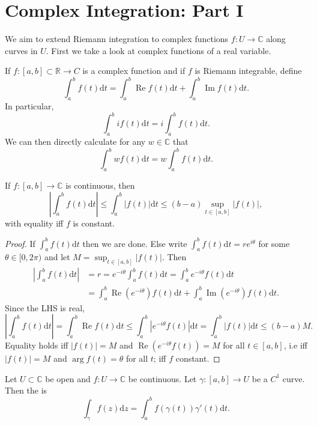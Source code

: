 \documentclass[a4paper]{scrartcl}
\begin{document}
\section{Complex Integration: Part I}
We aim to extend Riemann integration to complex functions $f: U \rightarrow \mathbb{C}$ along curves in $U$. First we take a look at complex functions of a real variable. 
\begin{definition*}
      If $f: [a,b] \subset \mathbb{R} \rightarrow C$ is a complex function and if $f$ is Riemann integrable, define \[
      \int_{a}^{b}f (t) \mathrm{d}t= \int_{a}^{b}\operatorname{Re} f (t) \mathrm{d}t+ \int_{a}^{b}\operatorname{Im}f (t) \mathrm{d}t   
      .\] In particular, \[
      \int_{a}^{b}i f (t) \mathrm{d}t =i \int_{a}^{b}f (t) \mathrm{d}t  
      .\] We can then directly calculate for any $w \in \mathbb{C}$ that \[
          \int_{a}^{b}w f (t) \mathrm{d}t =w\int_{a}^{b}f (t) \mathrm{d}t 
      .\] 
\end{definition*}
\begin{proposition}
      If $f: [a,b] \rightarrow \mathbb{C}$ is continuous, then \[
      |\int_{a}^{b} f (t) \mathrm{d}t | \leq \int_{a}^{b} |f (t)| \mathrm{d}t \leq (b-a) \sup_{t \in [a,b]} |f (t)|
      ,\] with equality iff $f$ is constant. 
\end{proposition}
\begin{proof}
      If $\int_{a}^{b}f (t) \mathrm{d}t $ then we are done. Else write $\int_{a}^{b}f (t) \mathrm{d}t= re^{i \theta} $ for some $\theta \in [0,2\pi)$ and let $M=\sup_{t \in [a,b]} |f (t)|$. Then 
      \begin{align*}
           |\int_{a}^{b}f (t) \mathrm{d}t| &=r= e^{-i \theta}\int_{a}^{b}f (t) \mathrm{d}t=\int_{a}^{b}e^{-i \theta}f (t) \mathrm{d}t\\
           &=\int_{a}^{b}\operatorname{Re}(e^{-i \theta}) f (t) \mathrm{d}t+ \int_{a}^{b} \operatorname{Im}(e^{-i \theta})f (t) \mathrm{d}t. 
      \end{align*}
      Since the LHS is real, \[
      |\int_{a}^{b}f (t) \mathrm{d}t|=\int_{a}^{b}\operatorname{Re} f (t) \mathrm{d}t \leq  \int_{a}^{b}|e^{-i \theta} f (t)| \mathrm{d}t=\int_{a}^{b}| f (t)| \mathrm{d}t\leq (b-a)M
      .\] 
      Equality holds iff $|f (t)|=M$ and $\operatorname{Re} (e ^{-i \theta}f (t))=M$ for all $t \in [a,b]$, i.e iff $|f (t)|=M$ and $\operatorname{arg} f (t)= \theta$ for all $t$; iff $f$ constant.
\end{proof}
\begin{definition*}
      Let $U \subset \mathbb{C}$ be open and $f: U \rightarrow \mathbb{C}$ be continuous. Let $\gamma: [a,b] \rightarrow U$ be a $C^1$ curve. Then the  is \[
      \int_{\gamma}^{}f (z) \mathrm{d}z= \int_{a}^{b} f (\gamma (t))\gamma' (t) \mathrm{d}t  
      .\]
\end{definition*}
\end{document}
